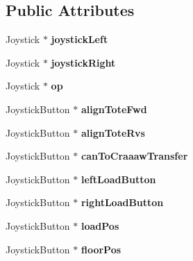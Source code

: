 \subsection*{Public Attributes}
\begin{DoxyCompactItemize}
\item 
\hypertarget{class_o_i_a1d056b8754b72891ef6da1fcc57e6937}{}Joystick $\ast$ {\bfseries joystick\+Left}\label{class_o_i_a1d056b8754b72891ef6da1fcc57e6937}

\item 
\hypertarget{class_o_i_a740a967966018d15fb252e76e658edca}{}Joystick $\ast$ {\bfseries joystick\+Right}\label{class_o_i_a740a967966018d15fb252e76e658edca}

\item 
\hypertarget{class_o_i_a48f3d1b95db9b9b8ed50eec3521063e0}{}Joystick $\ast$ {\bfseries op}\label{class_o_i_a48f3d1b95db9b9b8ed50eec3521063e0}

\item 
\hypertarget{class_o_i_a19dd6614b7fd36794d6e7776a1541f44}{}Joystick\+Button $\ast$ {\bfseries align\+Tote\+Fwd}\label{class_o_i_a19dd6614b7fd36794d6e7776a1541f44}

\item 
\hypertarget{class_o_i_a0ebb56babeb45576cc84b5f62e8f201e}{}Joystick\+Button $\ast$ {\bfseries align\+Tote\+Rvs}\label{class_o_i_a0ebb56babeb45576cc84b5f62e8f201e}

\item 
\hypertarget{class_o_i_a6067dbc43e7873abbe9460693929f39c}{}Joystick\+Button $\ast$ {\bfseries can\+To\+Craaaw\+Transfer}\label{class_o_i_a6067dbc43e7873abbe9460693929f39c}

\item 
\hypertarget{class_o_i_ab6757fb5ca25809e06d87890075fd6b4}{}Joystick\+Button $\ast$ {\bfseries left\+Load\+Button}\label{class_o_i_ab6757fb5ca25809e06d87890075fd6b4}

\item 
\hypertarget{class_o_i_a767feac46732443432a500c3a9b6c1f5}{}Joystick\+Button $\ast$ {\bfseries right\+Load\+Button}\label{class_o_i_a767feac46732443432a500c3a9b6c1f5}

\item 
\hypertarget{class_o_i_ac3dfc01ada91ae34a46a964c2222b3b3}{}Joystick\+Button $\ast$ {\bfseries load\+Pos}\label{class_o_i_ac3dfc01ada91ae34a46a964c2222b3b3}

\item 
\hypertarget{class_o_i_ae4fbe3a032ec2909b9ef274f6b61d739}{}Joystick\+Button $\ast$ {\bfseries floor\+Pos}\label{class_o_i_ae4fbe3a032ec2909b9ef274f6b61d739}


\end{DoxyCompactItemize}
